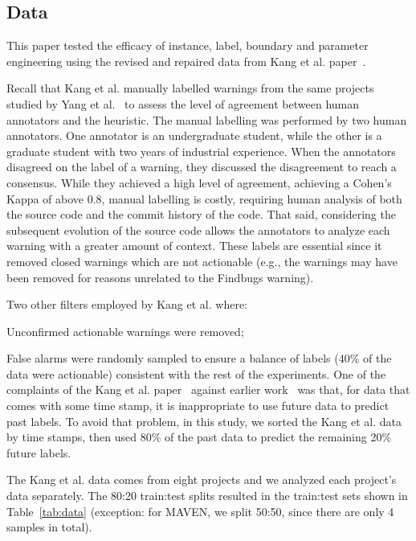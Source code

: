 
 \subsection{Data}
This paper tested the efficacy of instance, label,
boundary and parameter engineering using the revised
and repaired data from 
  Kang et al. paper~\cite{kang2022detecting}.
  
  Recall that
Kang et al. manually labelled warnings from the same projects studied by Yang et al.~\cite{yang2021learning} to assess the level of agreement between human annotators and the heuristic.
The manual labelling was performed by two human annotators. 
One annotator is an undergraduate student, while the other is a graduate student with two years of industrial experience.
When the annotators disagreed on the label of a warning, they discussed the disagreement to reach a consensus. 
While they achieved a high level of agreement, achieving a Cohen's Kappa of above 0.8, 
manual labelling is costly, requiring human analysis of both the source code and the commit history of the code.
That said, considering the subsequent evolution of the source code allows the annotators to analyze each warning with a greater amount of context.
These labels are essential
since it removed closed warnings which are not actionable (e.g., the warnings may have been removed for reasons unrelated to the Findbugs warning). 

Two other filters employed by Kang et al. where:
\bi
\item
Unconfirmed actionable warnings were removed;
\item
False alarms were randomly sampled to ensure a balance of labels (40\% of the data were actionable) consistent with the rest of the experiments.
\ei
One of the complaints of the Kang et al. paper~\cite{kang2022detecting}  against
earlier work~\cite{yang2021learning} was that, for data that comes with some time stamp, it is inappropriate to use future data to predict past labels. To avoid that problem,
in this study, we sorted the Kang et al. data by   time stamps,
then used 80\% of the past data to predict the remaining 20\% future labels.



The Kang et al. data comes from eight projects and we analyzed
each project's data separately. The 80:20 train:test splits
 resulted in the train:test sets shown in Table~\ref{tab:data}
 (exception: for MAVEN, we split 50:50, since there are only 4 samples in total). 
 

